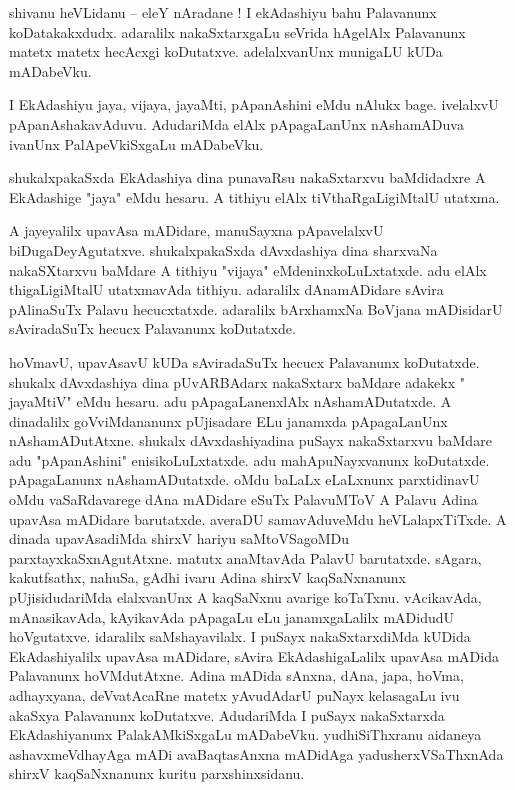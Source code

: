 \documentclass{article}
\begin{document}
\begin{mn}%
shivanu heVLidanu -- eleY nAradane ! I ekAdashiyu bahu Palavanunx koDatakakxdudx. adaralilx 
nakaSxtarxgaLu seVrida hAgelAlx Palavanunx matetx matetx hecAcxgi koDutatxve. adelalxvanUnx 
munigaLU kUDa mADabeVku.
\end{mn}

\begin{mn}%
I EkAdashiyu jaya, vijaya, jayaMti, pApanAshini eMdu nAlukx bage. ivelalxvU pApanAshakavAduvu. 
AdudariMda elAlx pApagaLanUnx nAshamADuva ivanUnx PalApeVkiSxgaLu mADabeVku.
\end{mn}

\begin{mn}%
shukalxpakaSxda EkAdashiya dina punavaRsu nakaSxtarxvu baMdidadxre A EkAdashige "jaya" eMdu hesaru. 
A tithiyu elAlx tiVthaRgaLigiMtalU utatxma.
\end{mn}

\begin{mn}%
A jayeyalilx upavAsa mADidare, manuSayxna pApavelalxvU biDugaDeyAgutatxve. shukalxpakaSxda 
dAvxdashiya dina sharxvaNa nakaSXtarxvu baMdare A tithiyu "vijaya" eMdeninxkoLuLxtatxde. adu 
elAlx thigaLigiMtalU utatxmavAda tithiyu. adaralilx dAnamADidare sAvira pAlinaSuTx Palavu 
hecucxtatxde. adaralilx bArxhamxNa BoVjana mADisidarU sAviradaSuTx hecucx Palavanunx koDutatxde.
\end{mn}

\begin{mn}%
hoVmavU, upavAsavU kUDa sAviradaSuTx hecucx Palavanunx koDutatxde. shukalx dAvxdashiya dina 
pUvARBAdarx nakaSxtarx baMdare adakekx " jayaMtiV" eMdu hesaru. adu pApagaLanenxlAlx 
nAshamADutatxde. A dinadalilx goVviMdananunx pUjisadare ELu janamxda pApagaLanUnx nAshamADutAtxne. 
shukalx dAvxdashiyadina puSayx nakaSxtarxvu baMdare adu "pApanAshini" enisikoLuLxtatxde. adu 
mahApuNayxvanunx koDutatxde. pApagaLanunx nAshamADutatxde. oMdu baLaLx eLaLxnunx parxtidinavU oMdu 
vaSaRdavarege dAna mADidare eSuTx PalavuMToV A Palavu Adina upavAsa mADidare barutatxde. averaDU 
samavAduveMdu heVLalapxTiTxde. A dinada upavAsadiMda shirxV hariyu saMtoVSagoMDu 
parxtayxkaSxnAgutAtxne. matutx anaMtavAda PalavU barutatxde. sAgara, kakutfsathx, nahuSa, gAdhi 
ivaru Adina shirxV kaqSaNxnanunx pUjisidudariMda elalxvanUnx A kaqSaNxnu avarige koTaTxnu. 
vAcikavAda, mAnasikavAda, kAyikavAda pApagaLu eLu janamxgaLalilx mADidudU hoVgutatxve. idaralilx  
saMshayavilalx. I puSayx nakaSxtarxdiMda kUDida EkAdashiyalilx upavAsa mADidare, sAvira 
EkAdashigaLalilx upavAsa mADida Palavanunx hoVMdutAtxne. Adina mADida sAnxna, dAna, japa, hoVma, 
adhayxyana, deVvatAcaRne matetx yAvudAdarU puNayx kelasagaLu ivu akaSxya Palavanunx koDutatxve. 
AdudariMda I puSayx nakaSxtarxda EkAdashiyanunx PalakAMkiSxgaLu mADabeVku. yudhiSiThxranu aidaneya 
ashavxmeVdhayAga mADi avaBaqtasAnxna mADidAga yadusherxVSaThxnAda shirxV kaqSaNxnanunx kuritu 
parxshinxsidanu.
\end{mn}
\end{document}
